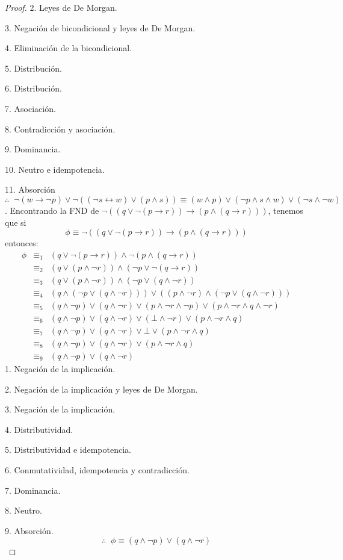 \documentclass{article}
\begin{document}
\begin{itemize}
\begin{proof}
    2. Leyes de De Morgan.
    
    3. Negación de bicondicional y leyes de De Morgan.
    
    4. Eliminación de la bicondicional.
    
    5. Distribución.
    
    6. Distribución.
    
    7. Asociación.
    
    8. Contradicción y asociación.
    
    9. Dominancia.
    
    10. Neutro e idempotencia.
    
    11. Absorción
    \[
    \therefore\;\; \neg(w \rightarrow \neg p) \lor \neg ((\neg s \leftrightarrow w) \lor (p \land s))
    \equiv (w \land p) \lor (\neg p \land s \land w)\lor (\neg s \land \neg w)
    \]
    . Encontrando la FND de $\neg((q \lor \neg (p \rightarrow r)) \rightarrow (p \land (q \rightarrow r)))$,
    tenemos que si
    \[
    \phi \equiv \neg((q \lor \neg (p \rightarrow r)) \rightarrow (p \land (q \rightarrow r)))
    \]
    entonces:
    \begin{eqnarray*}
      \phi &\equiv_{1}& (q \lor \neg (p \rightarrow r)) \land \neg (p \land (q \rightarrow r))\\
      &\equiv_{2}& (q \lor (p \land \neg r)) \land (\neg p \lor \neg (q \rightarrow r))\\
      &\equiv_{3}& (q \lor (p \land \neg r)) \land (\neg p \lor (q \land \neg r))\\
      &\equiv_{4}& (q \land (\neg p \lor (q \land \neg r))) \lor ((p \land \neg r) \land (\neg p \lor (q \land \neg r)))\\
      &\equiv_{5}& (q \land \neg p) \lor (q \land \neg r) \lor (p \land \neg r \land \neg p)
      \lor (p \land \neg r \land q \land \neg r)\\
      &\equiv_{6}& (q \land \neg p) \lor (q \land \neg r) \lor (\bot \land \neg r) \lor (p \land \neg r \land q)\\
      &\equiv_{7}& (q \land \neg p) \lor (q \land \neg r) \lor \bot \lor (p \land \neg r \land q)\\
      &\equiv_{8}& (q \land \neg p) \lor (q \land \neg r) \lor (p \land \neg r \land q)\\
      &\equiv_{9}& (q \land \neg p) \lor (q \land \neg r)
    \end{eqnarray*}
    1. Negación de la implicación.
    
    2. Negación de la implicación y leyes de De Morgan.
    
    3. Negación de la implicación.
    
    4. Distributividad.
    
    5. Distributividad e idempotencia.
    
    6. Conmutatividad, idempotencia y contradicción.
    
    7. Dominancia.
    
    8. Neutro.
    
    9. Absorción.
    \[
    \therefore\;\; \phi \equiv (q \land \neg p) \lor (q \land \neg r)
    \]
  \end{proof}
\end{itemize}
\end{document}
